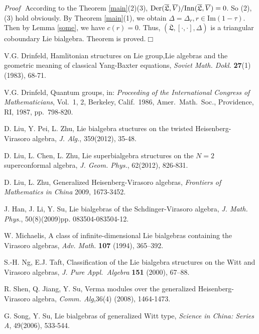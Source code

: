 \documentclass{amsart}
\theoremstyle{definition}
\theoremstyle{remark}
\numberwithin{equation}{subsection}
\numberwithin{equation}{section}
\begin{document}
 {\noindent}{\it Proof}\,\,  According to the  Theorem
 \ref{main}{\rm(2)}{\rm(3)}, ${{\rm Der}}(\overline{{\mathfrak{L}}}
,\overline{V})/{{\rm Inn}}(\overline{{\mathfrak{L}}} ,\overline{V})=0$. So
{\rm(2)},{\rm(3)} hold obviously. By Theorem \ref{main}{\rm(1)}, we
obtain $\Delta=\Delta_r, r\in \mathrm{Im}(1-\tau)$. Then by Lemma
\ref{some}, we have $c(r)=0$.  Thus,
$(\overline{\mathfrak{L}},[\cdot,\cdot],\Delta)$ is a triangular
coboundary Lie bialgebra. Theorem is proved.{\hfill$\Box$}


\begin{thebibliography}{99}

 V.G. Drinfeld, Hamlitonian structures on Lie group,Lie
algebras and the geometric meaning of classical Yang-Baxter
equations, {\it Soviet Math. Dokl.} {\bf27}(1) (1983), 68-71.

 V.G. Drinfeld, Quantum groups, in: {\it Proceeding of the
International Congress of Mathematicians}, Vol.~1, 2, Berkeley,
Calif.~1986, Amer.~Math.~Soc., Providence, RI, 1987, pp.~798-820.

 D. Liu, Y. Pei, L. Zhu, Lie bialgebra stuctures on the
twisted Heisenberg-Virasoro algebra, {\it J. Alg.}, 359(2012),
35-48.

 D. Liu, L. Chen, L. Zhu, Lie superbialgebra structures on
the $N=2$ superconformal algebra, {\it J. Geom. Phys.}, 62(2012),
826-831.

 D. Liu, L. Zhu, Generalized Heisenberg-Virasoro algebras,
 {\it Frontiers of Mathematics in China} 2009, 1673-3452.

 J. Han, J. Li, Y. Su, Lie bialgebras of the
Schdinger-Virasoro algebra, {\it J. Math. Phys.}, 50(8)(2009)pp.
083504-083504-12.

 W. Michaelis, A
class of infinite-dimensional Lie bialgebras containing the Virasoro
algebras, {\it Adv. Math.} {\bf107} (1994), 365--392.

 S.-H. Ng, E.J. Taft, Classification of the Lie bialgebra
structures on the Witt and Virasoro algebras, {\it J. Pure
Appl.~Algebra} {\bf151} (2000), 67--88.

 R. Shen, Q. Jiang, Y. Su, Verma modules over the
generalized Heisenberg-Virasoro algebra, {\it Comm. Alg},36(4)
(2008), 1464-1473.

 G. Song, Y. Su, Lie bialgebras of generalized Witt type,
{\it Science in China: Series A}, 49(2006), 533-544.


\end{thebibliography}
\end{document}

